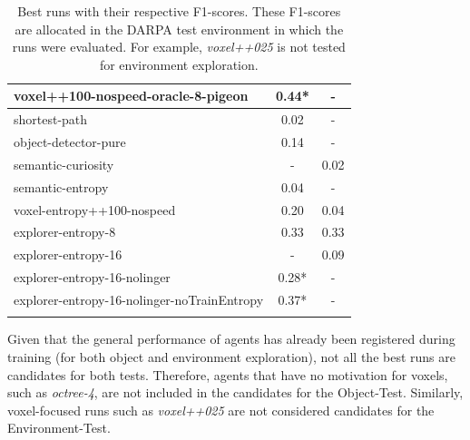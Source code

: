 \begin{longtable}{|l|c|c|}
                            voxel++100-nospeed-oracle-8-pigeon  & {\cellcolor[HTML]{55AA99}} \color[HTML]{000000} 0.44*   & -     \\ \hline
    
    shortest-path                           &  {\cellcolor[HTML]{EBF2F0}} \color[HTML]{000000} 0.02      & -    \\ \hline
    object-detector-pure                    & {\cellcolor[HTML]{EBF2F0}} \color[HTML]{000000} 0.14       & -    \\ \hline
    semantic-curiosity                      & -                                                          & {\cellcolor[HTML]{EBF2F0}} \color[HTML]{000000} 0.02      \\ \hline
    semantic-entropy                        & {\cellcolor[HTML]{EBF2F0}} \color[HTML]{000000} 0.04       & -            \\ \hline
    voxel-entropy++100-nospeed              & {\cellcolor[HTML]{D1E6E1}} \color[HTML]{000000} 0.20       & {\cellcolor[HTML]{EBF2F0}} \color[HTML]{000000} 0.04     \\ \hline
    explorer-entropy-8                      & {\cellcolor[HTML]{6BB4A6}} \color[HTML]{000000} 0.33      & {\cellcolor[HTML]{6BB4A6}} \color[HTML]{000000} 0.33  \\ \hline
    explorer-entropy-16                     & -                                                         & {\cellcolor[HTML]{EBF2F0}} \color[HTML]{000000} 0.09               \\ \hline
                        explorer-entropy-16-nolinger                  &  {\cellcolor[HTML]{88C3B7}} \color[HTML]{000000} 0.28*   & -        \\ \hline
                        explorer-entropy-16-nolinger-noTrainEntropy   & {\cellcolor[HTML]{55AA99}} \color[HTML]{000000} 0.37*    & -         \\ \hline

  

    \caption{Best runs with their respective F1-scores. These F1-scores are allocated in the DARPA test environment in which the runs were evaluated. For example, \textit{voxel++025} is not tested for environment exploration.}
    \label{tab:results-darpa-candidates}
\end{longtable}

\newpage

Given that the general performance of agents has already been registered during training (for both object and environment exploration), not all the best runs are candidates for both tests. 
Therefore, agents that have no motivation for voxels, such as \textit{octree-4}, are not included in the candidates for the {Object-Test}. Similarly, voxel-focused runs such as \textit{voxel++025} are not considered candidates for the Environment-Test.

